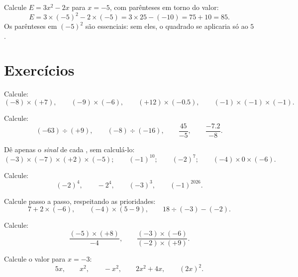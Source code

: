 \begin{example}\label{ex:g8:negprod:substitute}
Calcule $E = 3x^2 - 2x$ para $x = -5$, com parênteses em torno do
valor:
\[
E = 3 \times (-5)^2 - 2 \times (-5)
= 3 \times 25 - (-10)
= 75 + 10 = 85 .
\]
Os parênteses em $(-5)^2$ são essenciais: sem eles, o quadrado se
aplicaria só ao $5$.
\end{example}

\section{Exercícios}

\begin{exercise}[$\star$]\label{exo:g8:negprod:1}
Calcule:
\[
(-8) \times (+7), \qquad
(-9) \times (-6), \qquad
(+12) \times (-0.5), \qquad
(-1) \times (-1) \times (-1).
\]
\end{exercise}

\begin{exercise}[$\star$]\label{exo:g8:negprod:2}
Calcule:
\[
(-63) \div (+9), \qquad
(-8) \div (-16), \qquad
\frac{45}{-5}, \qquad
\frac{-7.2}{-8} .
\]
\end{exercise}

\begin{exercise}[$\star$]\label{exo:g8:negprod:3}
Dê apenas o \emph{sinal} de cada , sem calculá-lo:
\[
(-3) \times (-7) \times (+2) \times (-5); \qquad
(-1)^{10}; \qquad
(-2)^{7}; \qquad
(-4) \times 0 \times (-6).
\]
\end{exercise}

\begin{exercise}[$\star$]\label{exo:g8:negprod:4}
Calcule:
\[
(-2)^4, \qquad
-2^4, \qquad
(-3)^3, \qquad
(-1)^{2026} .
\]
\end{exercise}

\begin{exercise}[$\star$]\label{exo:g8:negprod:5}
Calcule passo a passo, respeitando as prioridades:
\[
7 + 2 \times (-6), \qquad
(-4) \times (5 - 9), \qquad
18 \div (-3) - (-2) .
\]
\end{exercise}

\begin{exercise}[$\star$]\label{exo:g8:negprod:6}
Calcule:
\[
\frac{(-5) \times (+8)}{-4}, \qquad
\frac{(-3) \times (-6)}{(-2) \times (+9)} .
\]
\end{exercise}

\begin{exercise}[$\star$]\label{exo:g8:negprod:7}
Calcule o valor para $x = -3$:
\[
5x, \qquad x^2, \qquad -x^2, \qquad 2x^2 + 4x, \qquad (2x)^2 .
\]
\end{exercise}

